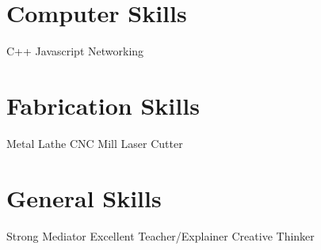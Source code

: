 \documentclass[10pt,a4paper,sans]{moderncv}
\begin{document}
\section{Computer Skills}
           {C++}
             {Javascript}
            {Networking}        
    
\section{Fabrication Skills}
          {Metal Lathe}
        {CNC Mill}
        {Laser Cutter}

\section{General Skills}
				{Strong Mediator}
					{Excellent Teacher/Explainer}
		{Creative Thinker}

	
\end{document}
